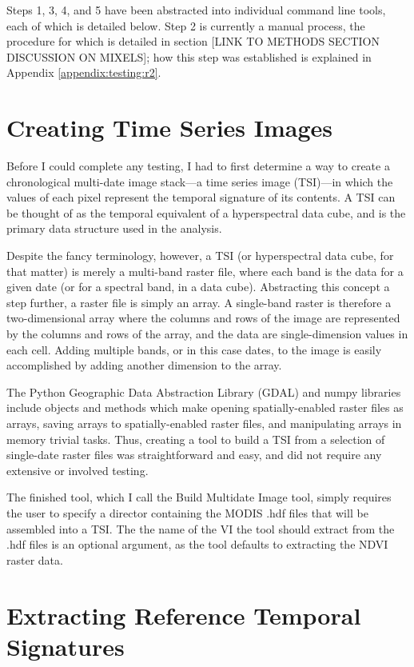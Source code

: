 Steps 1, 3, 4, and 5 have been abstracted into individual command line tools, each of which is detailed below. Step 2 is currently a manual process, the procedure for which is detailed in section [LINK TO METHODS SECTION DISCUSSION ON MIXELS]; how this step was established is explained in Appendix \ref{appendix:testing:r2}.

\section{Creating Time Series Images}

Before I could complete any testing, I had to first determine a way to create a chronological multi-date image stack---a time series image (TSI)---in which the values of each pixel represent the temporal signature of its contents. A TSI can be thought of as the temporal equivalent of a hyperspectral data cube, and is the primary data structure used in the analysis.

Despite the fancy terminology, however, a TSI (or hyperspectral data cube, for that matter) is merely a multi-band raster file, where each band is the data for a given date (or for a spectral band, in a data cube). Abstracting this concept a step further, a raster file is simply an array. A single-band raster is therefore a two-dimensional array where the columns and rows of the image are represented by the columns and rows of the array, and the data are single-dimension values in each cell. Adding multiple bands, or in this case dates, to the image is easily accomplished by adding another dimension to the array.

The Python Geographic Data Abstraction Library (GDAL) and numpy libraries include objects and methods which make opening spatially-enabled raster files as arrays, saving arrays to spatially-enabled raster files, and manipulating arrays in memory trivial tasks. Thus, creating a tool to build a TSI from a selection of single-date raster files was straightforward and easy, and did not require any extensive or involved testing.

The finished tool, which I call the Build Multidate Image tool, simply requires the user to specify a director containing the MODIS .hdf files that will be assembled into a TSI. The the name of the VI the tool should extract from the .hdf files is an optional argument, as the tool defaults to extracting the NDVI raster data.

\section{Extracting Reference Temporal Signatures}

